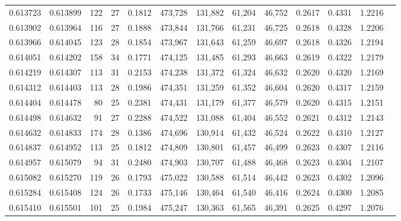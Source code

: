 \begin{tabular}{rrrrrrrrrrrrr}
0.613723 & 0.613899 &   122 &  27 &                                     0.1812 & 473,728 & 131,882 &  61,204 &  46,752 & 0.2617 & 0.4331 & 1.2216 \\
0.613902 & 0.613964 &   116 &  27 &                                     0.1888 & 473,844 & 131,766 &  61,231 &  46,725 & 0.2618 & 0.4328 & 1.2206 \\
0.613966 & 0.614045 &   123 &  28 &                                     0.1854 & 473,967 & 131,643 &  61,259 &  46,697 & 0.2618 & 0.4326 & 1.2194 \\
0.614051 & 0.614202 &   158 &  34 &                                     0.1771 & 474,125 & 131,485 &  61,293 &  46,663 & 0.2619 & 0.4322 & 1.2179 \\
0.614219 & 0.614307 &   113 &  31 &                                     0.2153 & 474,238 & 131,372 &  61,324 &  46,632 & 0.2620 & 0.4320 & 1.2169 \\
0.614312 & 0.614403 &   113 &  28 &                                     0.1986 & 474,351 & 131,259 &  61,352 &  46,604 & 0.2620 & 0.4317 & 1.2159 \\
0.614404 & 0.614478 &    80 &  25 &                                     0.2381 & 474,431 & 131,179 &  61,377 &  46,579 & 0.2620 & 0.4315 & 1.2151 \\
0.614498 & 0.614632 &    91 &  27 &                                     0.2288 & 474,522 & 131,088 &  61,404 &  46,552 & 0.2621 & 0.4312 & 1.2143 \\
0.614632 & 0.614833 &   174 &  28 &                                     0.1386 & 474,696 & 130,914 &  61,432 &  46,524 & 0.2622 & 0.4310 & 1.2127 \\
0.614837 & 0.614952 &   113 &  25 &                                     0.1812 & 474,809 & 130,801 &  61,457 &  46,499 & 0.2623 & 0.4307 & 1.2116 \\
0.614957 & 0.615079 &    94 &  31 &                                     0.2480 & 474,903 & 130,707 &  61,488 &  46,468 & 0.2623 & 0.4304 & 1.2107 \\
0.615082 & 0.615270 &   119 &  26 &                                     0.1793 & 475,022 & 130,588 &  61,514 &  46,442 & 0.2623 & 0.4302 & 1.2096 \\
0.615284 & 0.615408 &   124 &  26 &                                     0.1733 & 475,146 & 130,464 &  61,540 &  46,416 & 0.2624 & 0.4300 & 1.2085 \\
0.615410 & 0.615501 &   101 &  25 &                                     0.1984 & 475,247 & 130,363 &  61,565 &  46,391 & 0.2625 & 0.4297 & 1.2076 \\

\end{tabular}
